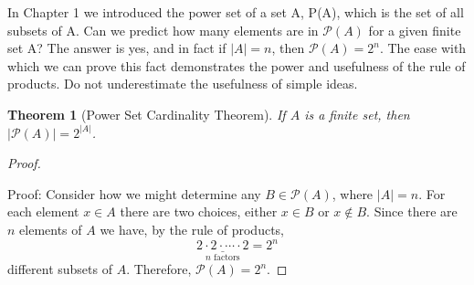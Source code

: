 \documentclass[10pt,]{book}
\theoremstyle{plain}
\newtheorem{theorem}{Theorem}[section]
\theoremstyle{definition}
\theoremstyle{definition}
\theoremstyle{definition}
\begin{document}
 In Chapter 1 we introduced the power set of a set A, P(A), which is the set of all subsets of A. Can we predict how many elements are in \(\mathcal{P}(A)\) for a given finite set A? The answer is yes, and in fact if \(\lvert A \rvert  = n\), then \(\mathcal{P}(A) = 2^{n}\).  The ease with which we can prove this fact demonstrates the power and usefulness of the rule of products. Do not underestimate the usefulness of simple ideas.
%
\begin{theorem}[Power Set Cardinality Theorem]\label{power-set-cardinality-theorem}
If \(A\) is a finite set, then \(\lvert \mathcal{P}(A) \rvert = 2^{\lvert A \rvert }\).%
\end{theorem}
\begin{proof}\hypertarget{proof-1}{}

Proof: Consider how we might determine any \(B \in \mathcal{P}(A)\), where \( \lvert A \rvert =n\). For each element \(x \in A\) there are two choices, either \(x \in B\) or \(x \notin B\).  Since there are \(n\)  elements of \(A\)  we have, by the rule of products, 
  \begin{equation*}\underset{n \textrm{ factors}}{\underline{2 \cdot 2 \cdot  \cdots \cdot 2}}=  2^n\end{equation*}   different subsets of \(A\). Therefore, \(\mathcal{P}(A)= 2^{n}\).
%
\end{proof}
\typeout{************************************************}
\typeout{************************************************}
\end{document}
